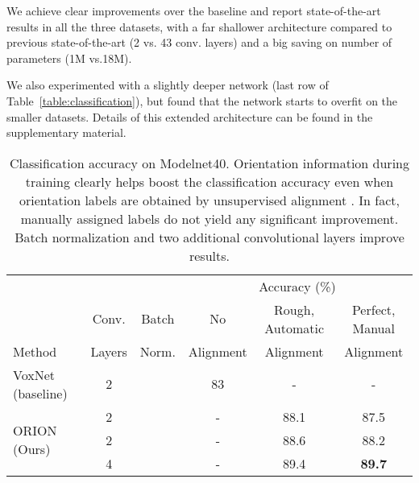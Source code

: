 \documentclass{bmvc2k}
\begin{document}
We achieve clear improvements over the baseline and report state-of-the-art results in all the three datasets, with a far shallower architecture compared to previous state-of-the-art (2 vs. 43 conv. layers) and a big saving on number of parameters (1M vs.18M).

We also experimented with a slightly deeper network (last row of Table~\ref{table:classification}), but found that the network starts to overfit on the smaller datasets. Details of this extended architecture can be found in the supplementary material.


\renewcommand{\multirowsetup}{\centering} \setlength{\tabcolsep}{4pt}
\begin{table*}[t]
\small
  \begin{center}
    \begin{tabular}{lccccc}
      \toprule

      {} & {} & {} & \multicolumn{3}{c}{Accuracy (\%)} \\
      \cmidrule{4-6}

      {}        & {Conv.}   & {Batch}   & {No}          & {Rough, Automatic}    & {Perfect, Manual} \\
      {Method}  & {Layers}  & {Norm.}   & {Alignment}   & {Alignment}           & {Alignment} \\

      \midrule

      VoxNet~\cite{maturana_voxnet_2015} (baseline)	& 2 &       & 83 & - & -\\
      \cmidrule{2-6}
      \multirow{3}{*}{ORION (Ours)}					    
            					                    & 2 &       & -  & 88.1 & 87.5\\
         						                    & 2 & \checkmark 	& -  & 88.6 & 88.2\\
         						                    & 4 & \checkmark 	& -  & 89.4 & \textbf{89.7}\\

      \bottomrule
    \end{tabular}\end{center}
  \caption{Classification accuracy on Modelnet40. Orientation information during training clearly helps boost the classification accuracy even when orientation labels are obtained by unsupervised alignment \cite{Sedaghat2015}. In fact, manually assigned labels do not yield any significant improvement. Batch normalization and two additional convolutional layers improve results.}
  \label{table:modelnet40}
\end{table*}
\end{document}
